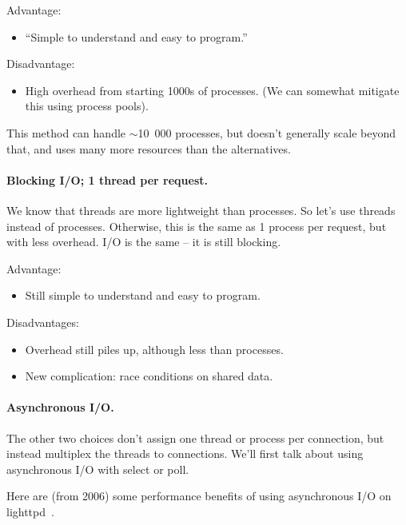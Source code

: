 Advantage:\\[-3em]
  \begin{itemize}[noitemsep]
    \item ``Simple to understand and easy to program.''
  \end{itemize}

Disadvantage:\\[-3em]
  \begin{itemize}[noitemsep]
    \item High overhead from starting 1000s of processes.
      (We can somewhat mitigate this using process pools).
  \end{itemize}
This method can handle $\sim$10~000 processes, but doesn't generally scale beyond that, and
uses many more resources than the alternatives.

\paragraph{Blocking I/O; 1 thread per request.}
    We know that threads are more lightweight than processes. So let's use threads instead
of processes. Otherwise, this is the same as 1 process per request, but with less overhead.
I/O is the same -- it is still blocking.

    Advantage:\\[-3em]
    \begin{itemize}[noitemsep]
      \item Still simple to understand and easy to program.
    \end{itemize}

    Disadvantages:\\[-3em]
    \begin{itemize}[noitemsep]
      \item Overhead still piles up, although less than processes.
      \item New complication: race conditions on shared data.
    \end{itemize}

\paragraph{Asynchronous I/O.} The other two choices don't assign one thread or process per connection,
but instead multiplex the threads to connections. We'll first talk
about using asynchronous I/O with select or poll.  

Here are (from 2006) some performance benefits of using asynchronous
I/O on lighttpd~\cite{lttpd}.

